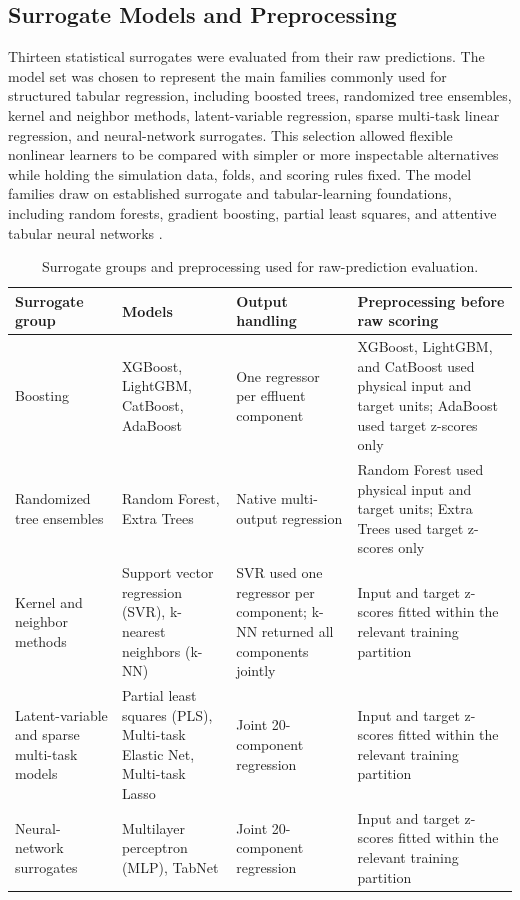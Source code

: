 \documentclass[12pt, twoside]{book}
\begin{document}
\subsection{Surrogate Models and Preprocessing}

Thirteen statistical surrogates were evaluated from their raw predictions. The model set was chosen to
represent the main families commonly used for structured tabular regression, including boosted trees,
randomized tree ensembles, kernel and neighbor methods, latent-variable regression, sparse multi-task linear
regression, and neural-network surrogates. This selection allowed flexible nonlinear learners to be compared with simpler or
more inspectable alternatives while holding the simulation data, folds, and scoring rules fixed.
The model families draw on established surrogate and tabular-learning foundations, including random forests,
gradient boosting, partial least squares, and attentive tabular neural networks
\citep{Breiman2001,ChenGuestrin2016,Wold2001,ArikPfister2021,Borisov2024}.

\begin{table}[htbp]
\centering
\caption{Surrogate groups and preprocessing used for raw-prediction evaluation.}
\label{tab:ch1_surrogate_protocol}
\scriptsize
\setlength{\tabcolsep}{3pt}
\begin{tabular}{>{\raggedright\arraybackslash}p{2.8cm}>{\raggedright\arraybackslash}p{3.7cm}>{\raggedright\arraybackslash}p{3.0cm}>{\raggedright\arraybackslash}p{3.8cm}}
\toprule
Surrogate group & Models & Output handling & Preprocessing before raw scoring \\
\midrule
Boosting & XGBoost, LightGBM, CatBoost, AdaBoost & One regressor per effluent component & XGBoost, LightGBM, and CatBoost used physical input and target units; AdaBoost used target z-scores only \\
Randomized tree ensembles & Random Forest, Extra Trees & Native multi-output regression & Random Forest used physical input and target units; Extra Trees used target z-scores only \\
Kernel and neighbor methods & Support vector regression (SVR), k-nearest neighbors (k-NN) & SVR used one regressor per component; k-NN returned all components jointly & Input and target z-scores fitted within the relevant training partition \\
Latent-variable and sparse multi-task models & Partial least squares (PLS), Multi-task Elastic Net, Multi-task Lasso & Joint 20-component regression & Input and target z-scores fitted within the relevant training partition \\
Neural-network surrogates & Multilayer perceptron (MLP), TabNet & Joint 20-component regression & Input and target z-scores fitted within the relevant training partition \\
\bottomrule
\end{tabular}
\end{table}
\end{document}
